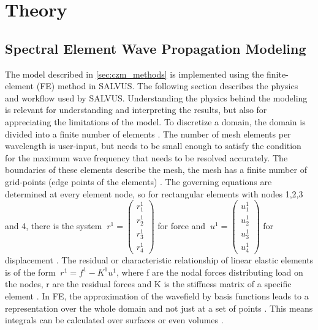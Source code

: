\chapter{Theory}
\label{chap:theory}
%
%

\section{Spectral Element Wave Propagation Modeling}
\label{sec:salvus_method}

The model described in \ref{sec:czm_methods} is implemented using the finite-element (FE) method in SALVUS. The following section describes the physics and workflow used by SALVUS. Understanding the physics behind the modeling is relevant for understanding and interpreting the results, but also for appreciating the limitations of the model. To discretize a domain, the domain is divided into a finite number of elements \parencite{FiniteElementMethod}. The number of mesh elements per wavelength is user-input, but needs to be small enough to satisfy the condition for the maximum wave frequency that needs to be resolved accurately. The boundaries of these elements describe the mesh, the mesh has a finite number of grid-points (edge points of the elements) \parencite{FiniteElementMethod}. The governing equations are determined at every element node, so for rectangular elements with nodes 1,2,3 and 4, there is the system $\ r^1 = \begin{pmatrix}r_1^1 \\ r_2^1 \\ r_3^1\\ r_4^1 \end{pmatrix}$ for force  and $\ u^1 = \begin{pmatrix}u_1^1 \\ u_2^1 \\ u_3^1\\ u_4^1 \end{pmatrix}$ for displacement \parencite{FiniteElementMethod}. The residual or characteristic relationship of linear elastic elements is of the form $\ r^1 = f^1-K^1u^1 $, where f are the nodal forces distributing load on the nodes, r are the residual forces and K is the stiffness matrix of a specific element \parencite{FiniteElementMethod}. In FE, the approximation of the wavefield by basis functions leads to a representation over the whole domain and not just at a set of points \parencite{afanasievModularFlexibleSpectralelement2019}. This means integrals can be calculated over surfaces or even volumes \parencite{afanasievModularFlexibleSpectralelement2019}. \par

